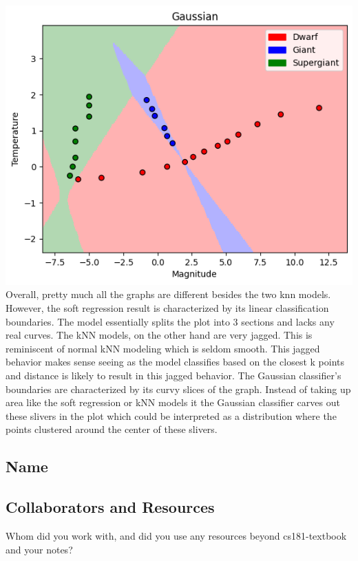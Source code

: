 \documentclass[submit]{harvardml}
\begin{document}
{\includegraphics[width=\textwidth]{images/4.png} \\
Overall, pretty much all the graphs are different besides the two knn models. However, the soft regression result is characterized by its linear classification boundaries. The model essentially splits the plot into 3 sections and lacks any real curves. The kNN models, on the other hand are very jagged. This is reminiscent of normal kNN modeling which is seldom smooth. This jagged behavior makes sense seeing as the model classifies based on the closest k points and distance is likely to result in this jagged behavior. The Gaussian classifier's boundaries are characterized by its curvy slices of the graph. Instead of taking up area like the soft regression or kNN models it the Gaussian classifier carves out these slivers in the plot which could be interpreted as a distribution where the points clustered around the center of these slivers.}


\subsection*{Name}

\subsection*{Collaborators and Resources}
Whom did you work with, and did you use any resources beyond cs181-textbook and your notes?
\end{document}
